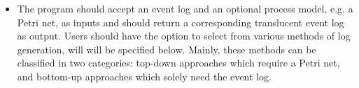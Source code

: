 

\begin{itemize}
    \item The program should accept an event log and an optional process model, e.g. a Petri net, as inputs and should return a corresponding translucent event log as output. Users should have the option to select from various methods of log generation, will will be specified below. Mainly, these methods can be classified in two categories: top-down approaches which require a Petri net, and bottom-up approaches which solely need the event log.
\end{itemize}
